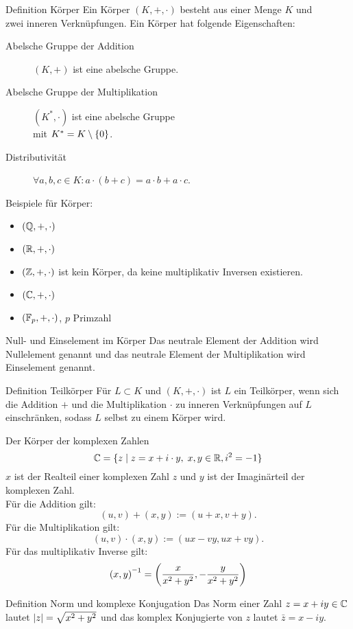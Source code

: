 \documentclass[main.tex]{subfiles}
\begin{document}
\begin{karte}{Definition Körper}
    Ein Körper \( (K,+,\cdot) \) besteht aus einer Menge 
    \(K\) und \\ 
    zwei inneren Verknüpfungen. Ein Körper hat folgende Eigenschaften: 
    \begin{description}
        \item[Abelsche Gruppe der Addition] 
        \( (K,+) \) ist eine abelsche Gruppe.
        \item[Abelsche Gruppe der Multiplikation]
        \( (K^*,\cdot) \) ist eine abelsche Gruppe\\
        mit \(K^* = K \setminus \{0\}\).
        \item[Distributivität]
        \( \forall a,b,c \in K : 
        a \cdot (b + c) = a \cdot b + a \cdot c\).
    \end{description}
    Beispiele für Körper: 
    \begin{itemize}
        \item \( (\mathbb{Q}, +, \cdot) \)
        \item \( (\mathbb{R}, +, \cdot) \)
        \item \( (\mathbb{Z}, +, \cdot) \) ist kein Körper, da keine 
        multiplikativ Inversen existieren.
        \item \( (\mathbb{C}, +, \cdot) \)
        \item \( (\mathbb{F}_p, +, \cdot) \), \(p\) Primzahl
    \end{itemize}
\end{karte}
\begin{karte}{Null- und Einselement im Körper}
    Das neutrale Element der Addition wird Nullelement genannt und 
    das neutrale Element der Multiplikation wird Einselement genannt.
\end{karte}
\begin{karte}{Definition Teilkörper}
    Für \( L \subset K \) und \( (K,+,\cdot) \) ist \(L\) 
    ein Teilkörper, wenn sich die Addition \(+\) und die 
    Multiplikation \( \cdot \) zu inneren Verknüpfungen 
    auf \(L\) einschränken, sodass \(L\) selbst zu einem 
    Körper wird.
\end{karte}
\begin{karte}{Der Körper der komplexen Zahlen}
    \[ \mathbb{C} = \{ z \;\vert \; z = x + i \cdot y, \; x, 
    y \in \mathbb{R}, i^2 = -1 \} \]
    \( x \) ist der Realteil einer komplexen Zahl \(z\) und 
    \( y \) ist der Imaginärteil der komplexen Zahl.\\
    Für die Addition gilt:
    \[ (u,v) + (x,y) := (u + x, v + y). \]
    Für die Multiplikation gilt: 
    \[ (u,v) \cdot (x,y) := (ux-vy, ux+vy). \]
    Für das multiplikativ Inverse gilt:
    \[ \inverse{(x,y)} = \left( \frac{x}{x^2 + y^2}, 
    -\frac{y}{ x^2 + y^2 } \right) \]
\end{karte}
\begin{karte}{Definition Norm und komplexe Konjugation}
    Das Norm einer Zahl \( z=x+iy \in \mathbb{C} \) lautet 
    \( \left| z \right| = \sqrt{x^2+y^2} \) und das komplex 
    Konjugierte von \(z\) lautet \( \bar{z} = x - iy \).
\end{karte}
\end{document}
